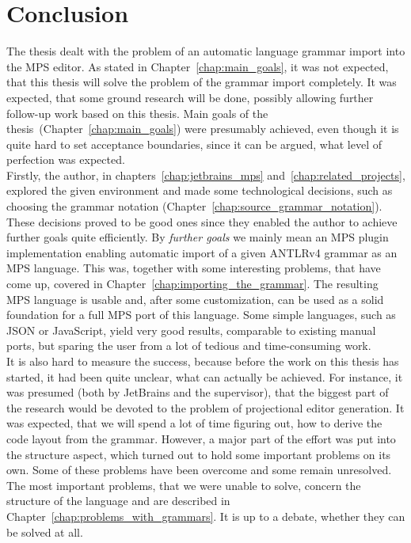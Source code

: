 \chapter{Conclusion}

The thesis dealt with the problem of an automatic language grammar import into the MPS editor.
As stated in Chapter~\ref{chap:main_goals}, it was not expected, that this thesis will solve the problem of the grammar import completely.
It was expected, that some ground research will be done, possibly allowing further follow-up work based on this thesis.
Main goals of the thesis~(Chapter~\ref{chap:main_goals}) were presumably achieved, even though it is quite hard to set acceptance boundaries, since it can be argued, what level of perfection was expected.
\\

Firstly, the author, in chapters~\ref{chap:jetbrains_mps} and~\ref{chap:related_projects}, explored the given environment and made some technological decisions, such as choosing the grammar notation (Chapter~\ref{chap:source_grammar_notation}).
These decisions proved to be good ones since they enabled the author to achieve further goals quite efficiently.
By \textit{further goals} we mainly mean an MPS plugin implementation enabling automatic import of a given ANTLRv4 grammar as an MPS language. This was, together with some interesting problems, that have come up, covered in Chapter~\ref{chap:importing_the_grammar}.
The resulting MPS language is usable and, after some customization, can be used as a solid foundation for a full MPS port of this language.
Some simple languages, such as JSON or JavaScript, yield very good results, comparable to existing manual ports, but sparing the user from a lot of tedious and time-consuming work.
\\

It is also hard to measure the success, because before the work on this thesis has started, it had been quite unclear, what can actually be achieved.
For instance, it was presumed (both by JetBrains and the supervisor), that the biggest part of the research would be devoted to the problem of projectional editor generation.
It was expected, that we will spend a lot of time figuring out, how to derive the code layout from the grammar.
However, a major part of the effort was put into the structure aspect, which turned out to hold some important problems on its own.
Some of these problems have been overcome and some remain unresolved.
The most important problems, that we were unable to solve, concern the structure of the language and are described in Chapter~\ref{chap:problems_with_grammars}.
It is up to a debate, whether they can be solved at all.
\\

